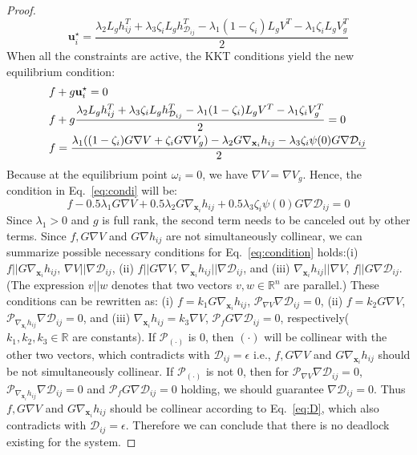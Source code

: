 \documentclass[letterpaper, 10 pt, conference]{ieeeconf}
\theoremstyle{plain}
\begin{document}
\begin{proof}
{\footnotesize
\begin{equation} \label{eq:condi}
\mathbf{u}_i^{\star} = \frac{ \lambda _{2} L_{g} h_{ij}^{{T}} + \lambda_3 \zeta_i L_gh_{\mathcal{D}_{ij}}^{T} - \lambda _{1} (1-\zeta_i) L_{g} V^{{T}} - \lambda_1 \zeta_i L_g V_g^{T}}{2} 
\end{equation}}
When all the constraints are active, the KKT conditions yield the new equilibrium condition:
{\footnotesize\begin{align}
&f + g \mathbf{u}_i^{\star} = 0 \notag \\
&f + g \frac{ \lambda _{2} L_{g} h_{ij}^{{T}} + \lambda_3 \zeta_i L_gh_{\mathcal{D}_{ij}}^{T} - \lambda _{1} (1-\zeta_i) L_{g}V^{{T}} - \lambda_1 \zeta_i V_g^{T}}{2} = 0 \notag \\
&f =\frac{\lambda_1 ((1-\zeta_i) G \nabla V + \zeta_i G \nabla V_g) - \lambda_2 G \nabla_{\mathbf{x}_i} h_{ij} - \lambda_3 \zeta_i \psi(0) G \nabla \mathcal{D}_{ij}}{2} \notag
\end{align}}
Because at the equilibrium point $\omega_i = 0$, we have $\nabla V = \nabla V_g$. Hence, the condition in Eq.~\eqref{eq:condi} will be: 
{\footnotesize
\begin{equation} \label{eq:condition}
f -0.5 \lambda_1 G \nabla V + 0.5\lambda_2 G \nabla_{\mathbf{x}_i} h_{ij} + 0.5 \lambda_3 \zeta_i \psi(0) G \nabla \mathcal{D}_{ij} = 0
\end{equation}}
Since $\lambda_1 > 0$ and $g$ is full rank, the second term needs to be canceled out by other terms. Since $f, G \nabla V$ and $G \nabla h_{ij}$ are not simultaneously collinear, we can summarize possible necessary conditions for Eq.~\eqref{eq:condition} holds:(i) $f || G \nabla_{\mathbf{x}_i} h_{ij}$, $\nabla V || \nabla \mathcal{D}_{ij}$,
(ii) $f || G \nabla V$, $\nabla_{\mathbf{x}_i} h_{ij} || \nabla \mathcal{D}_{ij}$, and
(iii) $\nabla_{\mathbf{x}_i} h_{ij} || \nabla V$, $f || G \nabla \mathcal{D}_{ij}$. (The expression $v || w$
denotes that two vectors $v, w \in \mathbb{R}^{n}$ are parallel.) These conditions can be rewritten as: (i) $f = \textit{k}_1 G \nabla_{\mathbf{x}_i} h_{ij}$, $\mathcal{P}_{\nabla V} \nabla \mathcal{D}_{ij} = 0$,
(ii) $f = \textit{k}_2 G \nabla V$, $\mathcal{P}_{\nabla_{\mathbf{x}_i} h_{ij}} \nabla \mathcal{D}_{ij} = 0$, and
(iii) $\nabla_{\mathbf{x}_i} h_{ij}=  \textit{k}_3 \nabla V$, $\mathcal{P}_{f} G \nabla \mathcal{D}_{ij} = 0$, respectively($\textit{k}_1, \textit{k}_2, \textit{k}_3 \in \mathbb{R}$ are constants). If $\mathcal{P}_{(\cdot)}$ is $0$, then $(\cdot)$ will be collinear with the other two vectors, which contradicts with $\mathcal{D}_{ij} = \epsilon$ i.e., $f, G \nabla V$ and $G \nabla_{\mathbf{x}_i} h_{ij}$ should be not simultaneously collinear. 
If $\mathcal{P}_{(\cdot)} $ is not $0$, then for $\mathcal{P}_{\nabla V} \nabla \mathcal{D}_{ij} = 0$, $\mathcal{P}_{\nabla_{\mathbf{x}_i} h_{ij}} \nabla \mathcal{D}_{ij} = 0$ and $\mathcal{P}_{f} G \nabla \mathcal{D}_{ij} = 0$ holding, we should guarantee $\nabla \mathcal{D}_{ij} = 0$. Thus $f, G \nabla V$ and $G \nabla_{\mathbf{x}_i} h_{ij}$ should be collinear according to Eq.~\eqref{eq:D}, which also contradicts with $\mathcal{D}_{ij} = \epsilon$. Therefore we can conclude that there is no deadlock existing for the system. 
\end{proof}
\end{document}

